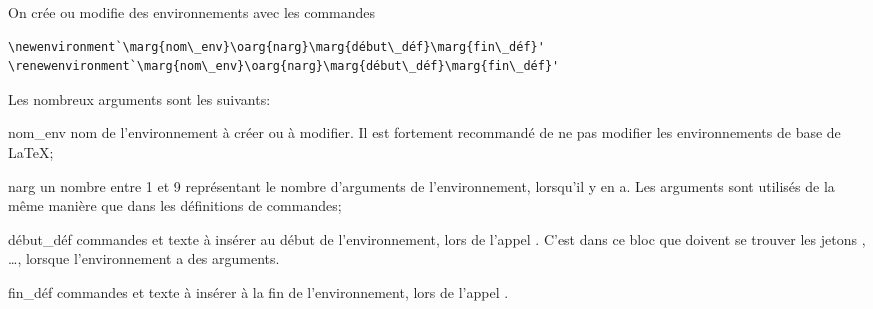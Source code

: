 On crée ou modifie des environnements avec les commandes
\begin{lstlisting}
\newenvironment`\marg{nom\_env}\oarg{narg}\marg{début\_déf}\marg{fin\_déf}'
\renewenvironment`\marg{nom\_env}\oarg{narg}\marg{début\_déf}\marg{fin\_déf}'
\end{lstlisting}
Les nombreux arguments sont les suivants:
\begin{list}{}{%
    \setlength{\labelsep}{1.5ex}
    \setlength{\leftmargin}{\labelwidth}
    \addtolength{\leftmargin}{\labelsep}
    \setlength{\parsep}{0.5ex plus0.2ex minus0.2ex}
    \setlength{\itemsep}{0.3ex}
    \renewcommand{\makelabel}[1]{\meta{#1}\hfill}}
%

\item[nom\_env] nom de l'environnement à créer ou à modifier.
  Il est fortement recommandé de ne pas modifier les environnements de
  base de {\LaTeX};
\item[narg] un nombre entre 1 et 9 représentant le nombre
  d'arguments de l'environnement, lorsqu'il y en a. Les arguments sont
  utilisés de la même manière que dans les définitions de commandes;
\item[début\_déf] commandes et texte à insérer au début de
  l'environnement, lors de l'appel .
  C'est dans ce bloc que doivent se trouver les jetons ,
  \dots, \code{\#} lorsque l'environnement a des
  arguments.
\item[fin\_déf] commandes et texte à insérer à la fin de
  l'environnement, lors de l'appel .
  \end{list}

